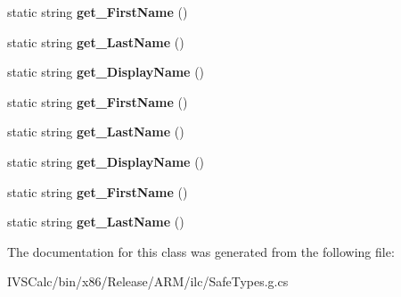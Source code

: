 \begin{DoxyCompactItemize}
static string {\bfseries get\+\_\+\+First\+Name} ()
\item 
\mbox{\label{class_windows_1_1_system_1_1_known_user_properties_a69e714eac194204abdff610afa983bf3}} 
static string {\bfseries get\+\_\+\+Last\+Name} ()
\item 
\mbox{\label{class_windows_1_1_system_1_1_known_user_properties_a66020dec00599527010fe8fd3b98cf14}} 
static string {\bfseries get\+\_\+\+Display\+Name} ()
\item 
\mbox{\label{class_windows_1_1_system_1_1_known_user_properties_a93afdb7576ee6887c61ce9791d335541}} 
static string {\bfseries get\+\_\+\+First\+Name} ()
\item 
\mbox{\label{class_windows_1_1_system_1_1_known_user_properties_a69e714eac194204abdff610afa983bf3}} 
static string {\bfseries get\+\_\+\+Last\+Name} ()
\item 
\mbox{\label{class_windows_1_1_system_1_1_known_user_properties_a66020dec00599527010fe8fd3b98cf14}} 
static string {\bfseries get\+\_\+\+Display\+Name} ()
\item 
\mbox{\label{class_windows_1_1_system_1_1_known_user_properties_a93afdb7576ee6887c61ce9791d335541}} 
static string {\bfseries get\+\_\+\+First\+Name} ()
\item 
\mbox{\label{class_windows_1_1_system_1_1_known_user_properties_a69e714eac194204abdff610afa983bf3}} 
static string {\bfseries get\+\_\+\+Last\+Name} ()
\end{DoxyCompactItemize}


The documentation for this class was generated from the following file\+:\begin{DoxyCompactItemize}
\item 
I\+V\+S\+Calc/bin/x86/\+Release/\+A\+R\+M/ilc/Safe\+Types.\+g.\+cs\end{DoxyCompactItemize}
